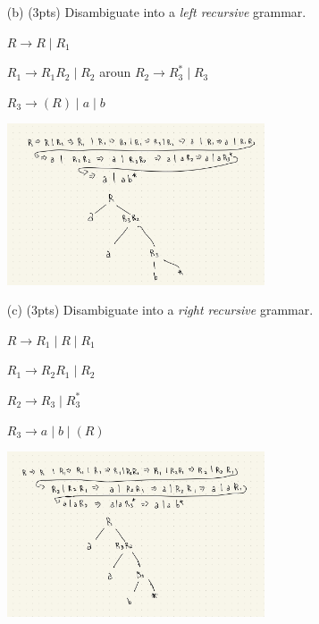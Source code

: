 \documentclass[11pt]{amsart}
\begin{document}
\begin{enumerate}

\item[(b)](3pts) Disambiguate into a \emph{left recursive} grammar.

\vspace{0.25cm}

$R \rightarrow R \mid R_1$

$R_1 \rightarrow R_1 R_2 \mid R_2$
aroun
$R_2 \rightarrow R_3^* \mid R_3$

$R_3 \rightarrow (R) \mid a \mid b$

\begin{center}
	\includegraphics[width=0.6\textwidth]{IMG_0079.jpg}
\end{center}

\vspace{0.25cm}
\newpage
\item[(c)](3pts) Disambiguate into a \emph{right recursive} grammar.

\vspace{0.25cm}

$R \rightarrow R_1 \mid R \mid R_1$

$R_1 \rightarrow R_2 R_1 \mid R_2$

$R_2 \rightarrow R_3 \mid R_3^*$

$R_3 \rightarrow a \mid b \mid (R)$

\begin{center}
	\includegraphics[width=0.6\textwidth]{IMG_0080.jpg}
\end{center}

\end{enumerate}
\end{document}
